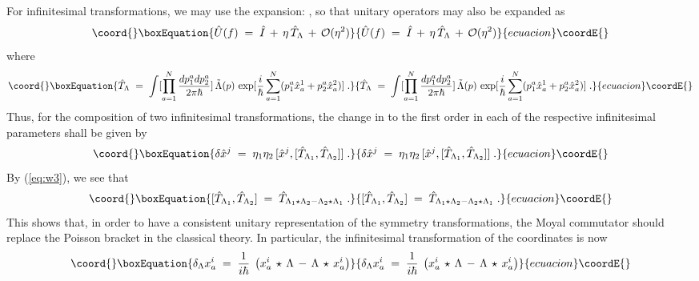 \documentclass[a4paper,12pt]{article}
\begin{document}
For infinitesimal transformations, we may use the expansion:
\coordHE{}, so that
unitary operators may also be expanded as
\begin{equation}\coord{}\boxEquation{
  \label{eq:opexp}
{\hat U}(f)\;=\; {\hat I} \,+\, \eta \, {\hat T}_\Lambda \,+\,
{\mathcal O}(\eta^2)
}{
  {\hat U}(f)\;=\; {\hat I} \,+\, \eta \, {\hat T}_\Lambda \,+\,
{\mathcal O}(\eta^2)
}{ecuacion}\coordE{}\end{equation}
where
\begin{equation}\coord{}\boxEquation{
{\hat T}_\Lambda \;=\; \int [\prod_{a=1}^N \frac{dp_1^a
dp_2^a}{2\pi \hbar}]\,
{\tilde \Lambda}(p) \, 
\exp [ \frac{i}{\hbar} \sum_{a=1}^N (p_1^a {\hat x}^1_a +p_2^a
{\hat x}^2_a) ]
\;.
}{
{\hat T}_\Lambda \;=\; \int [\prod_{a=1}^N \frac{dp_1^a
dp_2^a}{2\pi \hbar}]\,
{\tilde \Lambda}(p) \, 
\exp [ \frac{i}{\hbar} \sum_{a=1}^N (p_1^a {\hat x}^1_a +p_2^a
{\hat x}^2_a) ]
\;.
}{ecuacion}\coordE{}\end{equation}
Thus, for the composition of two infinitesimal transformations, the
change in \coordHE{} to the first order in each of the respective
infinitesimal parameters \coordHE{} shall be given by
\begin{equation}\coord{}\boxEquation{
  \label{eq:compo}
\delta {\hat x}^j \;=\; \eta_1 \eta_2 \, 
[{\hat x}^j , [{\hat T}_{\Lambda_1} , {\hat T}_{\Lambda_2}]] \;.
}{
  \delta {\hat x}^j \;=\; \eta_1 \eta_2 \, 
[{\hat x}^j , [{\hat T}_{\Lambda_1} , {\hat T}_{\Lambda_2}]] \;.
}{ecuacion}\coordE{}\end{equation}
By (\ref{eq:w3}), we see that
\begin{equation}\coord{}\boxEquation{
   \label{eq:comm}
 [{\hat T}_{\Lambda_1} , {\hat T}_{\Lambda_2}] \;=\; {\hat
T}_{\Lambda_1 \star \Lambda_2
- \Lambda_2 \star \Lambda_1} \;.
}{
   [{\hat T}_{\Lambda_1} , {\hat T}_{\Lambda_2}] \;=\; {\hat
T}_{\Lambda_1 \star \Lambda_2
- \Lambda_2 \star \Lambda_1} \;.
}{ecuacion}\coordE{}\end{equation}
This shows that, in order to have a consistent unitary
representation
of the symmetry transformations, the Moyal commutator should
replace
the Poisson bracket in the classical theory. In particular, the
infinitesimal transformation of the coordinates is now
\begin{equation}\coord{}\boxEquation{
  \label{eq:nctrns}
\delta_\Lambda x^i_a \;=\;\frac{1}{i \hbar}\; \left( x^i_a \, \star
\, \Lambda \,-\, \Lambda \,\star\, x^i_a \right)
}{
  \delta_\Lambda x^i_a \;=\;\frac{1}{i \hbar}\; \left( x^i_a \, \star
\, \Lambda \,-\, \Lambda \,\star\, x^i_a \right)
}{ecuacion}\coordE{}\end{equation}
\end{document}
